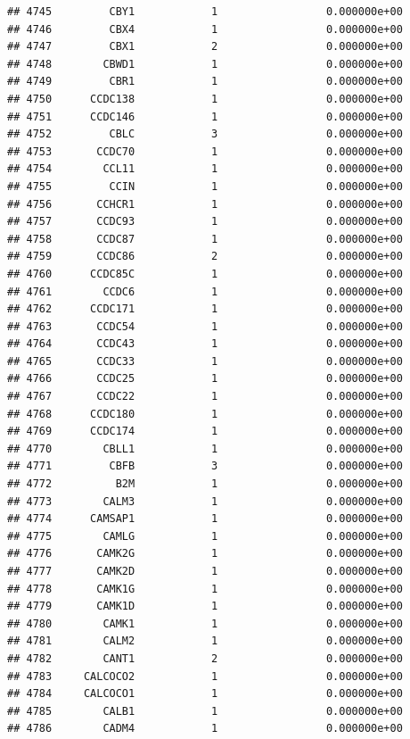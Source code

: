 \documentclass[
]{article}
\begin{document}
\begin{verbatim}
## 4745         CBY1            1                 0.000000e+00
## 4746         CBX4            1                 0.000000e+00
## 4747         CBX1            2                 0.000000e+00
## 4748        CBWD1            1                 0.000000e+00
## 4749         CBR1            1                 0.000000e+00
## 4750      CCDC138            1                 0.000000e+00
## 4751      CCDC146            1                 0.000000e+00
## 4752         CBLC            3                 0.000000e+00
## 4753       CCDC70            1                 0.000000e+00
## 4754        CCL11            1                 0.000000e+00
## 4755         CCIN            1                 0.000000e+00
## 4756       CCHCR1            1                 0.000000e+00
## 4757       CCDC93            1                 0.000000e+00
## 4758       CCDC87            1                 0.000000e+00
## 4759       CCDC86            2                 0.000000e+00
## 4760      CCDC85C            1                 0.000000e+00
## 4761        CCDC6            1                 0.000000e+00
## 4762      CCDC171            1                 0.000000e+00
## 4763       CCDC54            1                 0.000000e+00
## 4764       CCDC43            1                 0.000000e+00
## 4765       CCDC33            1                 0.000000e+00
## 4766       CCDC25            1                 0.000000e+00
## 4767       CCDC22            1                 0.000000e+00
## 4768      CCDC180            1                 0.000000e+00
## 4769      CCDC174            1                 0.000000e+00
## 4770        CBLL1            1                 0.000000e+00
## 4771         CBFB            3                 0.000000e+00
## 4772          B2M            1                 0.000000e+00
## 4773        CALM3            1                 0.000000e+00
## 4774      CAMSAP1            1                 0.000000e+00
## 4775        CAMLG            1                 0.000000e+00
## 4776       CAMK2G            1                 0.000000e+00
## 4777       CAMK2D            1                 0.000000e+00
## 4778       CAMK1G            1                 0.000000e+00
## 4779       CAMK1D            1                 0.000000e+00
## 4780        CAMK1            1                 0.000000e+00
## 4781        CALM2            1                 0.000000e+00
## 4782        CANT1            2                 0.000000e+00
## 4783     CALCOCO2            1                 0.000000e+00
## 4784     CALCOCO1            1                 0.000000e+00
## 4785        CALB1            1                 0.000000e+00
## 4786        CADM4            1                 0.000000e+00

\end{verbatim}
\end{document}
